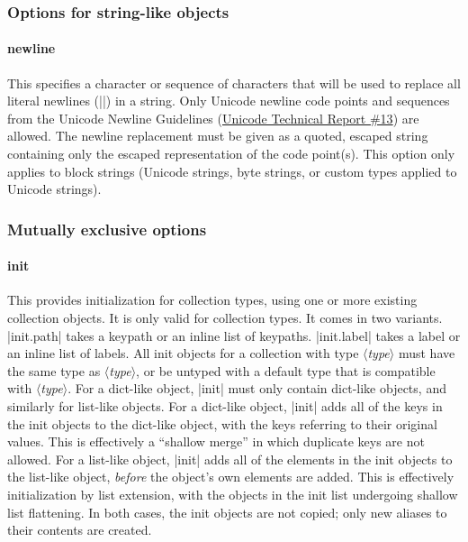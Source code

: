 \documentclass[11pt]{article}
\newcommand{\vmeta}[1]{{\color{DarkRed}\ensuremath{\langle}\textit{#1}\ensuremath{\rangle}}}
\begin{document}
{{\subsubsection{Options for string-like objects}

\paragraph{newline}
This specifies a character or sequence of characters that will be used to replace all literal newlines (|\n|) in a string.  Only Unicode newline code points and sequences from the Unicode Newline Guidelines (\href{http://unicode.org/standard/reports/tr13/tr13-5.html}{Unicode Technical Report \#13}) are allowed.  The newline replacement must be given as a quoted, escaped string containing only the escaped representation of the code point(s).  This option only applies to block strings (Unicode strings, byte strings, or custom types applied to Unicode strings).


\subsubsection{Mutually exclusive options}

\paragraph{init}

This provides initialization for collection types, using one or more existing collection objects.  It is only valid for collection types.  It comes in two variants. |init.path| takes a keypath or an inline list of keypaths.  |init.label| takes a label or an inline list of labels.  All init objects for a collection with type \vmeta{type} must have the same type as \vmeta{type}, or be untyped with a default type that is compatible with \vmeta{type}.  For a dict-like object, |init| must only contain dict-like objects, and similarly for list-like objects.  For a dict-like object, |init| adds all of the keys in the init objects to the dict-like object, with the keys referring to their original values.  This is effectively a ``shallow merge'' in which duplicate keys are not allowed.  For a list-like object, |init| adds all of the elements in the init objects to the list-like object, \emph{before} the object's own elements are added.  This is effectively initialization by list extension, with the objects in the init list undergoing shallow list flattening.  In both cases, the init objects are not copied; only new aliases to their contents are created.

}}
\end{document}
